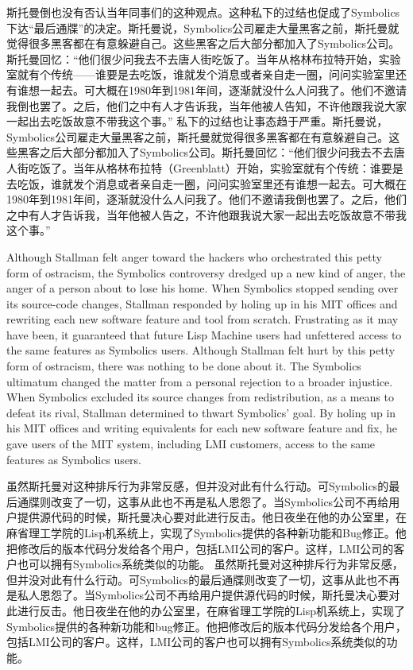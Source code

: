 \ifdefined\chs
\ifdefined\vone
斯托曼倒也没有否认当年同事们的这种观点。这种私下的过结也促成了Symbolics下达``最后通牒''的决定。斯托曼说，Symbolics公司雇走大量黑客之前，斯托曼就觉得很多黑客都在有意躲避自己。这些黑客之后大部分都加入了Symbolics公司。斯托曼回忆：``他们很少问我去不去唐人街吃饭了。当年从格林布拉特开始，实验室就有个传统——谁要是去吃饭，谁就发个消息或者亲自走一圈，问问实验室里还有谁想一起去。可大概在1980年到1981年间，逐渐就没什么人问我了。他们不邀请我倒也罢了。之后，他们之中有人才告诉我，当年他被人告知，不许他跟我说大家一起出去吃饭故意不带我这个事。''
\fi
\ifdefined\vtwo
私下的过结也让事态趋于严重。斯托曼说，Symbolics公司雇走大量黑客之前，斯托曼就觉得很多黑客都在有意躲避自己。这些黑客之后大部分都加入了Symbolics公司。斯托曼回忆：``他们很少问我去不去唐人街吃饭了。当年从格林布拉特（Greenblatt）开始，实验室就有个传统：谁要是去吃饭，谁就发个消息或者亲自走一圈，问问实验室里还有谁想一起去。可大概在1980年到1981年间，逐渐就没什么人问我了。他们不邀请我倒也罢了。之后，他们之中有人才告诉我，当年他被人告之，不许他跟我说大家一起出去吃饭故意不带我这个事。''
\fi
\fi

\ifdefined\eng
\ifdefined\vone
Although Stallman felt anger toward the hackers who orchestrated this petty form of ostracism, the Symbolics controversy dredged up a new kind of anger, the anger of a person about to lose his home. When Symbolics stopped sending over its source-code changes, Stallman responded by holing up in his MIT offices and rewriting each new software feature and tool from scratch. Frustrating as it may have been, it guaranteed that future Lisp Machine users had unfettered access to the same features as Symbolics users.
\fi
\ifdefined\vtwo
Although Stallman felt hurt by this petty form of ostracism, there was nothing to be done about it.  The Symbolics ultimatum changed the matter from a personal rejection to a broader injustice. When Symbolics excluded its source changes from redistribution, as a means to defeat its rival, Stallman determined to thwart Symbolics' goal. By holing up in his MIT offices and writing equivalents for each new software feature and fix, he gave users of the MIT system, including LMI customers, access to the same features as Symbolics users.
\fi
\fi

\ifdefined\chs
\ifdefined\vone
虽然斯托曼对这种排斥行为非常反感，但并没对此有什么行动。可Symbolics的最后通牒则改变了一切，这事从此也不再是私人恩怨了。当Symbolics公司不再给用户提供源代码的时候，斯托曼决心要对此进行反击。他日夜坐在他的办公室里，在麻省理工学院的Lisp机系统上，实现了Symbolics提供的各种新功能和Bug修正。他把修改后的版本代码分发给各个用户，包括LMI公司的客户。这样，LMI公司的客户也可以拥有Symbolics系统类似的功能。
\fi
\ifdefined\vtwo
虽然斯托曼对这种排斥行为非常反感，但并没对此有什么行动。可Symbolics的最后通牒则改变了一切，这事从此也不再是私人恩怨了。当Symbolics公司不再给用户提供源代码的时候，斯托曼决心要对此进行反击。他日夜坐在他的办公室里，在麻省理工学院的Lisp机系统上，实现了Symbolics提供的各种新功能和bug修正。他把修改后的版本代码分发给各个用户，包括LMI公司的客户。这样，LMI公司的客户也可以拥有Symbolics系统类似的功能。
\fi
\fi

